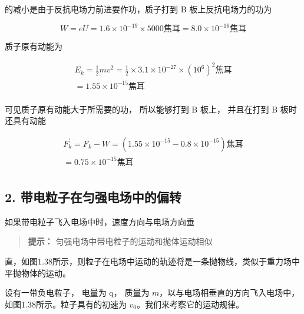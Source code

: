 的减小是由于反抗电场力前进要作功，质子打到 B 板上反抗电场力的功为

\[
W=eU=1.6\times10^{-19}\times5000\text{焦耳}=8.0\times10^{-16}\text{焦耳}
\]

质子原有动能为

\[
\begin{array}{l} E_k=\frac12mv^2=\frac12\times3.1\times10^{-27}\times(10^6)^2\text{焦耳} \\ = 1.55 \times 10^{- 15} \text{焦耳} \\ \end{array}
\]

可见质子原有动能大于所需要的功， 所以能够打到 B 板上， 并且在打到 B
板时还具有动能

\[
\begin{array}{l} F_{k}^{\prime} = F_{k} - W = (1.55 \times 10^{- 15} - 0.8 \times 10^{- 15}) \text{焦耳} \\ = 0.75 \times 10^{- 15} \text{焦耳} \\ \end{array}
\]

\subsection{2.
带电粒子在匀强电场中的偏转}\label{ux5e26ux7535ux7c92ux5b50ux5728ux5300ux5f3aux7535ux573aux4e2dux7684ux504fux8f6c}

如果带电粒子飞入电场中时，速度方向与电场方向垂

\begin{quote}
\textbf{提示：} 匀强电场中带电粒子的运动和抛体运动相似
\end{quote}

直，如图1.38所示，则粒子在电场中运动的轨迹将是一条抛物线，类似于重力场中平抛物体的运动。

设有一带负电粒子， 电量为 q， 质量为
\(m\)，以与电场相垂直的方向飞入电场中，如图1.38所示。粒子具有的初速为
\(v_0\)。我们来考察它的运动规律。

